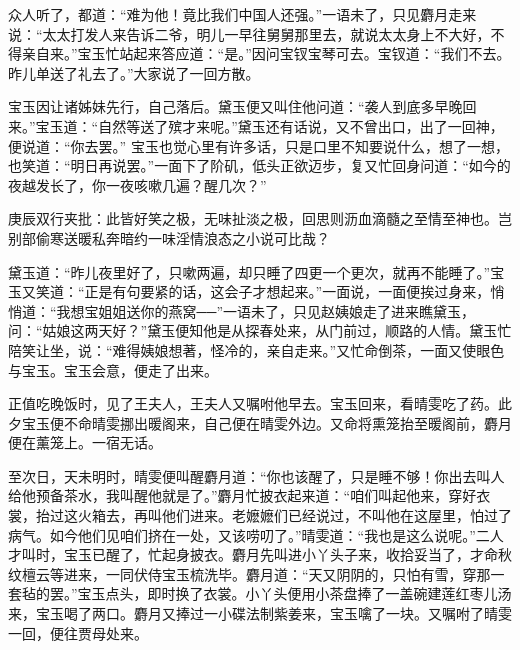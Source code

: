 \begin{parag}
    众人听了，都道：“难为他！竟比我们中国人还强。”一语未了，只见麝月走来说：“太太打发人来告诉二爷，明儿一早往舅舅那里去，就说太太身上不大好，不得亲自来。”宝玉忙站起来答应道：“是。”因问宝钗宝琴可去。宝钗道：“我们不去。昨儿单送了礼去了。”大家说了一回方散。
\end{parag}


\begin{parag}
    宝玉因让诸姊妹先行，自己落后。黛玉便又叫住他问道：“袭人到底多早晚回来。”宝玉道：“自然等送了殡才来呢。”黛玉还有话说，又不曾出口，出了一回神，便说道：“你去罢。” 宝玉也觉心里有许多话，只是口里不知要说什么，想了一想，也笑道：“明日再说罢。”一面下了阶矶，低头正欲迈步，复又忙回身问道：“如今的夜越发长了，你一夜咳嗽几遍？醒几次？”\begin{note}庚辰双行夹批：此皆好笑之极，无味扯淡之极，回思则沥血滴髓之至情至神也。岂别部偷寒送暖私奔暗约一味淫情浪态之小说可比哉？\end{note}黛玉道：“昨儿夜里好了，只嗽两遍，却只睡了四更一个更次，就再不能睡了。”宝玉又笑道：“正是有句要紧的话，这会子才想起来。”一面说，一面便挨过身来，悄悄道：“我想宝姐姐送你的燕窝──”一语未了，只见赵姨娘走了进来瞧黛玉，问：“姑娘这两天好？”黛玉便知他是从探春处来，从门前过，顺路的人情。黛玉忙陪笑让坐，说：“难得姨娘想著，怪冷的，亲自走来。”又忙命倒茶，一面又使眼色与宝玉。宝玉会意，便走了出来。
\end{parag}


\begin{parag}
    正值吃晚饭时，见了王夫人，王夫人又嘱咐他早去。宝玉回来，看晴雯吃了药。此夕宝玉便不命晴雯挪出暖阁来，自己便在晴雯外边。又命将熏笼抬至暖阁前，麝月便在薰笼上。一宿无话。
\end{parag}


\begin{parag}
    至次日，天未明时，晴雯便叫醒麝月道：“你也该醒了，只是睡不够！你出去叫人给他预备茶水，我叫醒他就是了。”麝月忙披衣起来道：“咱们叫起他来，穿好衣裳，抬过这火箱去，再叫他们进来。老嬷嬷们已经说过，不叫他在这屋里，怕过了病气。如今他们见咱们挤在一处，又该唠叨了。”晴雯道：“我也是这么说呢。”二人才叫时，宝玉已醒了，忙起身披衣。麝月先叫进小丫头子来，收拾妥当了，才命秋纹檀云等进来，一同伏侍宝玉梳洗毕。麝月道：“天又阴阴的，只怕有雪，穿那一套毡的罢。”宝玉点头，即时换了衣裳。小丫头便用小茶盘捧了一盖碗建莲红枣儿汤来，宝玉喝了两口。麝月又捧过一小碟法制紫姜来，宝玉噙了一块。又嘱咐了晴雯一回，便往贾母处来。
\end{parag}


